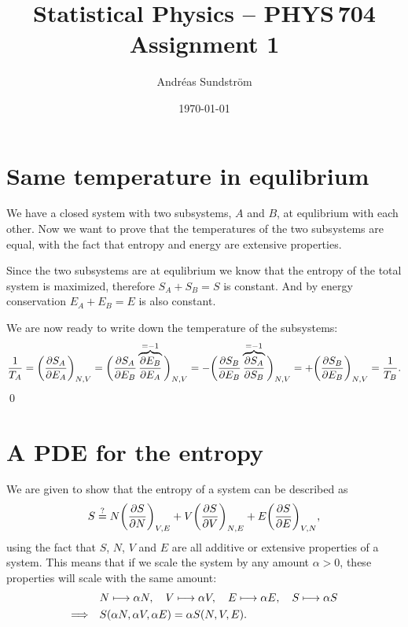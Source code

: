 \documentclass[11pt,letter, swedish, english
]{article}
\begin{document}
\title{Statistical Physics -- PHYS\,704 \\
Assignment 1}
\author{Andréas Sundström}
\date{\today}

\maketitle



\section{Same temperature in equlibrium}
We have a closed system with two subsystems, $A$ and $B$, at
equlibrium with each other. Now we want to prove that the temperatures
of the two subsystems are equal, with the fact that entropy and energy
are extensive properties. 

Since the two subsystems are at equlibrium we know that the entropy of
the total system is maximized, therefore $S_A+S_B=S$ is constant. And
by energy conservation $E_A+E_B=E$ is also constant. 

We are now ready to write down the temperature of the subsystems:
\begin{equation}
\frac{1}{T_A}=\qty(\pdv{S_A}{E_A})_{N,V} 
=\bigg(\pdv{S_A}{E_B}\overbrace{\pdv{E_B}{E_A}}^{=-1}\bigg)_{N,V} 
=-\bigg(\pdv{S_B}{E_B}\overbrace{\pdv{S_A}{S_B}}^{=-1}\bigg)_{N,V} 
=+\qty(\pdv{S_B}{E_B})_{N,V} = \frac{1}{T_B}.
\end{equation}
\qed

\section{A PDE for the entropy}
We are given to show that the entropy of a system can be described as
\begin{equation}
S \stackrel{?}{=} N\qty(\pdv{S}{N})_{V,E} 
+ V\qty(\pdv{S}{V})_{N,E}
+ E\qty(\pdv{S}{E})_{V,N},
\end{equation}
using the fact that $S$, $N$, $V$ and $E$ are all additive or
extensive properties of a system. This means that if we scale the
system by any amount $\alpha>0$, these properties will scale with the
same amount:
\begin{align}
&N\longmapsto\alpha N\qcomma V\longmapsto \alpha V 
\qcomma E\longmapsto \alpha E\qcomma S\longmapsto \alpha S\\
\label{eq:scale_S}
\Longrightarrow\quad& S(\alpha N, \alpha V, \alpha E) = \alpha S(N, V, E).
\end{align}
\end{document}
